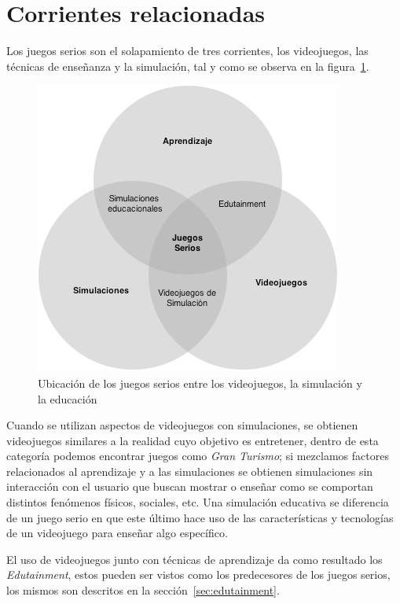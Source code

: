 \section{Corrientes relacionadas}

Los juegos serios son el solapamiento de tres corrientes, los videojuegos, las
técnicas de enseñanza y la simulación\cite{education:games}, tal y
como se observa en la figura~\ref{fig:corrientes_relacionadas}. 

\begin{figure}[ht]
\centering
\includegraphics[scale=0.7]{juegos_serios/corrientes_paralelas.png}
\caption{Ubicación de los juegos serios entre los videojuegos, la simulación y
    la educación}
\label{fig:corrientes_relacionadas}
\end{figure}

Cuando se utilizan aspectos de videojuegos con simulaciones, se obtienen videojuegos 
similares a la realidad cuyo objetivo es entretener, dentro de esta
categoría podemos encontrar juegos como \emph{Gran Turismo}; si mezclamos
factores relacionados al aprendizaje y a las simulaciones se obtienen
simulaciones sin interacción con el usuario que buscan mostrar o enseñar como se
comportan distintos fenómenos físicos, sociales, etc. Una simulación educativa se 
diferencia de un juego serio en que este último hace uso de las características y 
tecnologías de un videojuego para enseñar algo específico. 

El uso de videojuegos junto con técnicas de aprendizaje da como resultado los 
\emph{Edutainment}, estos pueden ser vistos como los predecesores de los juegos
serios, los mismos son descritos en la sección~\ref{sec:edutainment}.

